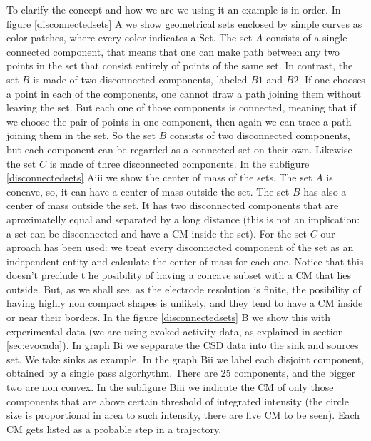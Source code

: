 \documentclass[12pt]{article}
\begin{document}
To clarify the concept and how we are we using it an example is in order. In figure \ref{disconnectedsets} A we show geometrical sets enclosed by simple curves as color patches, where every color indicates a Set. The set $A$ consists of a single connected component, that means that one can make  path between any two points in the set that consist entirely of points of the same set. In contrast, the set $B$ is made of two disconnected components, labeled $B1$ and $B2$. If one chooses a point in each of the components, one cannot draw a path joining them without leaving the set. But each one of those components is connected, meaning that if we choose the pair of points in one component, then again we can trace a path joining them in the set. So the set $B$ consists of two disconnected components, but each component can be regarded as a connected set on their own. Likewise the set $C$ is made of three disconnected components. In the subfigure \ref{disconnectedsets} Aiii we show the center of mass of the sets. The set $A$ is concave, so, it can have a center of mass outside the set. The
set $B$ has also a center of mass outside the set. It has two disconnected components that are aproximatelly
equal and separated by a long distance (this is not an implication: a set can be disconnected and have
a CM inside the set). For the set $C$ our aproach has been used: we treat every disconnected component of the
set as an independent entity and calculate the center of mass for each one. Notice that this doesn't preclude t
he posibility of having a concave subset with a CM that lies outside. But, as we shall see,
as the electrode resolution is finite, the posibility of having highly non compact shapes is unlikely, and they
tend to have a CM inside or near their borders. In the figure \ref{disconnectedsets} B we show this with experimental
data (we are using evoked activity data, as explained in section \ref{sec:evocada}). In graph Bi we
sepparate the CSD data into the sink and sources set. We take sinks as example. In the graph Bii
we label each disjoint component, obtained by a single pass algorhythm. There are 25 components, and
the bigger two are non convex. In the
subfigure Biii we indicate the CM of only those components that are above certain threshold of
integrated intensity (the circle size  is proportional in area to such intensity, there are five CM to be
seen). Each CM gets listed as a probable step in a trajectory.
\end{document}
